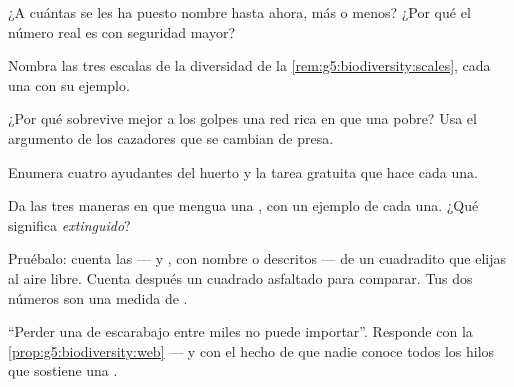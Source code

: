 \begin{exercise}[$\star$]\label{exo:g5:biodiversity:3}
¿A cuántas  se les ha puesto nombre hasta ahora, más o menos?
¿Por qué el número real es con seguridad mayor?
\end{exercise}

\begin{exercise}[$\star$]\label{exo:g5:biodiversity:4}
Nombra las tres escalas de la diversidad de la
\cref{rem:g5:biodiversity:scales}, cada una con su ejemplo.
\end{exercise}

\begin{exercise}[$\star$]\label{exo:g5:biodiversity:5}
¿Por qué sobrevive mejor a los golpes una red rica en  que una
pobre? Usa el argumento de los cazadores que se cambian de presa.
\end{exercise}

\begin{exercise}[$\star$]\label{exo:g5:biodiversity:6}
Enumera cuatro  ayudantes del huerto y la tarea gratuita que
hace cada una.
\end{exercise}

\begin{exercise}[$\star$]\label{exo:g5:biodiversity:7}
Da las tres maneras en que mengua una , con un ejemplo de cada
una. ¿Qué significa \emph{extinguido}?
\end{exercise}

\begin{exercise}[$\star$]\label{exo:g5:biodiversity:8}
Pruébalo: cuenta las  ---  y , con nombre o
descritos --- de un cuadradito que elijas al aire libre. Cuenta
después un cuadrado asfaltado para comparar. Tus dos números son una
medida de .
\end{exercise}

\begin{exercise}[$\star\star$]\label{exo:g5:biodiversity:9}
``Perder una  de escarabajo entre miles no puede importar''.
Responde con la \cref{prop:g5:biodiversity:web} --- y con el hecho de
que nadie conoce todos los hilos que sostiene una .
\end{exercise}

